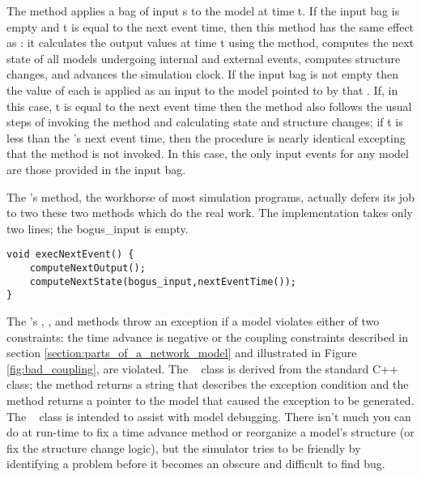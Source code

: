 The  method applies a bag of input s to the model at time t. If the input bag is empty and t is equal to the next event time, then this method has the same effect as : it calculates the output values at time t using the  method, computes the next state of all models undergoing internal and external events, computes structure changes, and advances the simulation clock. If the input bag is not empty then the value of each  is applied as an input to the model pointed to by that . If, in this case, t is equal to the next event time then the method also follows the usual steps of invoking the  method and calculating state and structure changes; if t is less than the 's next event time, then the procedure is nearly identical excepting that the  method is not invoked. In this case, the only input events for any model are those provided in the input bag.

The 's  method, the workhorse of most simulation programs, actually defers its job to two these two methods which do the real work. The implementation takes only two lines; the  bogus\_input is empty.
\begin{verbatim}
void execNextEvent() {
    computeNextOutput();
    computeNextState(bogus_input,nextEventTime());
}
\end{verbatim}

The 's , , and  methods throw an exception if a model violates either of two constraints: the time advance is negative or the coupling constraints described in section \ref{section:parts_of_a_network_model} and illustrated in Figure \ref{fig:bad_coupling}, are violated. The \adevs\  class is derived from the standard C++  class; the method  returns a string that describes the exception condition and the method  returns a pointer to the model that caused the exception to be generated. The \adevs\  class is intended to assist with model debugging. There isn't much you can do at run-time to fix a time advance method or reorganize a model's structure (or fix the structure change logic), but the simulator tries to be friendly by identifying a problem before it becomes an obscure and difficult to find bug.
